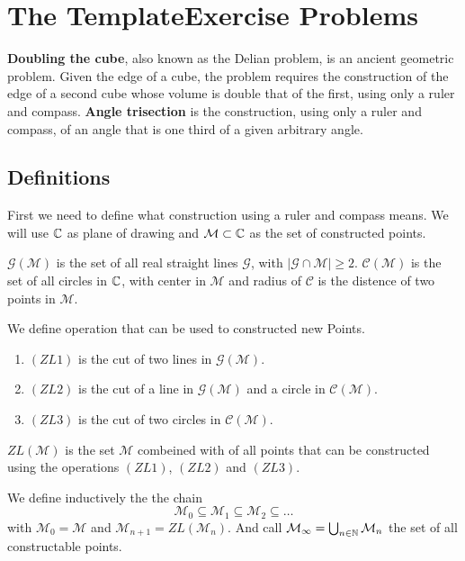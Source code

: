 \documentclass{../Proof_layout_PDF/TemplateExercise}
\begin{document}
\section{The TemplateExercise Problems}
\textbf{Doubling the cube}, also known as the Delian problem, is an ancient geometric problem.
Given the edge of a cube, the problem requires the construction of the edge of a second cube whose volume is double that of the first,
using only a ruler and compass.
\newline
\textbf{Angle trisection} is the construction, using only a ruler and compass, of an angle that is one third of a given arbitrary angle.

\subsection{Definitions}
First we need to define what construction using a ruler and compass means.
We will use $\mathbb{C}$ as plane of drawing and $\mathcal{M} \subset \mathbb{C}$ as the set of constructed points.
\begin{definition}
    $\mathcal{G(M)}$ is the set of all real straight lines $\mathcal{G}$, with $| \mathcal{G} \cap \mathcal{M} |\ge 2$.\newline
    $\mathcal{C(M)}$ is the set of all circles in $\mathbb{C}$, with center in $\mathcal{M}$ and radius of $\mathcal{C}$ is the distence of two points in $\mathcal{M}$.
\end{definition}

\begin{definition}
    We define operation that can be used to constructed new Points.
    \begin{enumerate}
        \item $(ZL 1)$ is the cut of two lines in $\mathcal{G(M)}$.
        \item $(ZL 2)$ is the cut of a line in $\mathcal{G(M)}$ and a circle in $\mathcal{C(M)}$.
        \item $(ZL 3)$ is the cut of two circles in $\mathcal{C(M)}$.
    \end{enumerate}
    $ZL(\mathcal{M})$ is the set $\mathcal{M}$ combeined with of all points that can be constructed using the operations $(ZL 1)$, $(ZL 2)$ and $(ZL 3)$.
\end{definition}

\begin{definition}
    We define inductively the the chain
    \begin{equation*}
        \mathcal{M}_0 \subseteq \mathcal{M}_1 \subseteq \mathcal{M}_2 \subseteq \dots
    \end{equation*}
    with $\mathcal{M}_0 = \mathcal{M}$ and $\mathcal{M}_{n+1} = ZL(\mathcal{M}_n)$.\newline
    And call $\mathcal{M}_{\infty} = \bigcup_{n \in \mathbb{N}} \mathcal{M}_n$ the set of all constructable points.
\end{definition}
\end{document}
